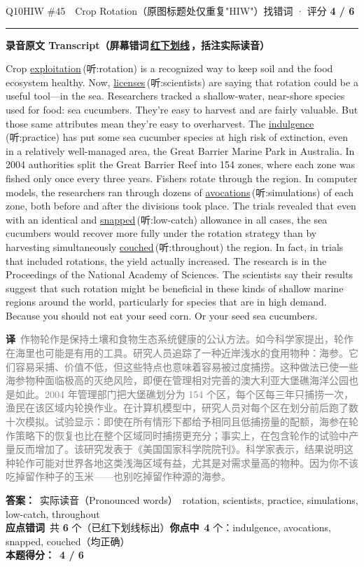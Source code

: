 \documentclass[11pt]{article}
\newcommand{\ptesub}[1]{%
  \par\needspace{2\baselineskip}\smallskip
  {\color{cAccent}\rule[-0.2ex]{3pt}{1.05em}}\hspace{6pt}%
  {\bfseries\color{cHead}#1}\par\nopagebreak\smallskip}
\newcommand{\zh}[1]{{\footnotesize\textcolor{cNote}{\textbf{译}}\ \textcolor{gray}{#1}}}
\newcommand{\hiw}[2]{{\color{cWrong}\uline{#1}}\,{\footnotesize\color{cFix}(听:#2)}} %
\begin{document}
\begin{qblock}{Q10\quad HIW \#45\ \ Crop Rotation（原图标题处仅重复"HIW"）}{找错词 · 评分 \textcolor{cAccent}{\bfseries 4 / 6}}
\ptesub{录音原文 Transcript（屏幕错词\,{\color{cWrong}\uline{红下划线}}\,，括注实际读音）}
\begin{promptbox}
Crop \hiw{exploitation}{rotation} is a recognized way to keep soil and the food ecosystem healthy. Now, \hiw{licenses}{scientists} are saying that rotation could be a useful tool---in the sea. Researchers tracked a shallow-water, near-shore species used for food: sea cucumbers. They're easy to harvest and are fairly valuable. But those same attributes mean they're easy to overharvest. The \hiw{indulgence}{practice} has put some sea cucumber species at high risk of extinction, even in a relatively well-managed area, the Great Barrier Marine Park in Australia. In 2004 authorities split the Great Barrier Reef into 154 zones, where each zone was fished only once every three years. Fishers rotate through the region. In computer models, the researchers ran through dozens of \hiw{avocations}{simulations} of each zone, both before and after the divisions took place. The trials revealed that even with an identical and \hiw{snapped}{low-catch} allowance in all cases, the sea cucumbers would recover more fully under the rotation strategy than by harvesting simultaneously \hiw{couched}{throughout} the region. In fact, in trials that included rotations, the yield actually increased. The research is in the Proceedings of the National Academy of Sciences. The scientists say their results suggest that such rotation might be beneficial in these kinds of shallow marine regions around the world, particularly for species that are in high demand. Because you should not eat your seed corn. Or your seed sea cucumbers.
\end{promptbox}
\zh{作物轮作是保持土壤和食物生态系统健康的公认方法。如今科学家提出，轮作在海里也可能是有用的工具。研究人员追踪了一种近岸浅水的食用物种：海参。它们容易采捕、价值不低，但这些特点也意味着容易被过度捕捞。这种做法已使一些海参物种面临极高的灭绝风险，即便在管理相对完善的澳大利亚大堡礁海洋公园也是如此。2004 年管理部门把大堡礁划分为 154 个区，每个区每三年只捕捞一次，渔民在该区域内轮换作业。在计算机模型中，研究人员对每个区在划分前后跑了数十次模拟。试验显示：即使在所有情形下都给予相同且低捕捞量的配额，海参在轮作策略下的恢复也比在整个区域同时捕捞更充分；事实上，在包含轮作的试验中产量反而增加了。该研究发表于《美国国家科学院院刊》。科学家表示，结果说明这种轮作可能对世界各地这类浅海区域有益，尤其是对需求量高的物种。因为你不该吃掉留作种子的玉米——也别吃掉留作种源的海参。}
\par\smallskip
\textbf{答案：}\ 实际读音（Pronounced words）\ {\color{cFix}rotation, scientists, practice, simulations, low-catch, throughout}\\
\textbf{应点错词}\ 共 \textbf{6} 个（已红下划线标出）\qquad\textbf{你点中}\ \textbf{4} 个：indulgence, avocations, snapped, couched（均正确）\\[2pt]\textbf{本题得分：}\ {\color{cAccent}\bfseries 4 / 6}
\end{qblock}
\end{document}
